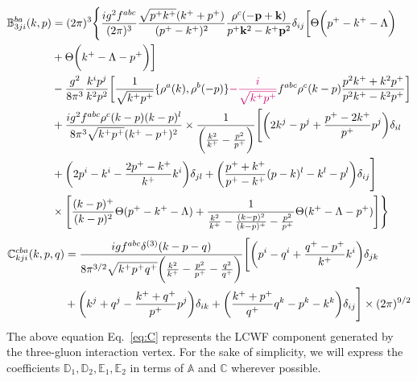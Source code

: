 \documentclass[a4paper,11pt]{article}
\def\v#1{\mathbf{#1}}
\def\mf#1{\mathbb{#1}}
\begin{document}
\begin{align} \label{eq:B3}
    \mf{B}^{ba}_{3ji}(k, p) & = (2\pi)^{3}\Bigg\{\frac{ig^2 f^{abc}}{(2\pi)^3} \frac{\sqrt{p^{+}k^{+}} (k^++p^+) } {(p^+-k^+)^2} \frac{\rho^c(-\v{p}+\v{k})}{p^{+}\v{k}^2 - k^{+}\v{p}^2} \delta_{ij}\bigg[\Theta\bigg(p^{+} - k^{+} - \Lambda\bigg)\notag \\ & +\Theta\bigg(k^{+}-\Lambda-p^{+}\bigg)\bigg]\notag \\ & -\frac{g^{2}}{8\pi^{3}}\frac{k^{i}p^{j}}{k^{2}p^{2}}\bigg[\frac{1}{\sqrt{k^{+}p^{+}}}\{\rho^{a}(k),\rho^{b}(-p)\}{\color{chg}-\frac{i}{\sqrt{k^{+}p^{+}}}}f^{abc}\rho^{c}(k-p)\frac{p^{2}k^{+}+k^{2}p^{+}}{p^{2}k^{+}-k^{2}p^{+}}\bigg]\notag \\ & + \frac{ig^{2}f^{abc}\rho^{c}(k-p)(k-p)^{l}}{8\pi^{3}\sqrt{k^{+}p^{+}}(k^{+}-p^{+})^{2}}\times \frac{1}{\bigg(\frac{k^{2}}{k^{+}}-\frac{p^{2}}{p^{+}}\bigg)} \Bigg[\bigg(2k^{j}-p^{j}+\frac{p^{+}-2k^{+}}{p^{+}}p^{j}\bigg)\delta_{il}\notag \\ & +\bigg(2p^{i}-k^{i}-\frac{2p^{+}-k^{+}}{k^{+}}k^{i}\bigg)\delta_{jl} +\bigg(\frac{p^{+}+k^{+}}{p^{+}-k^{+}}(p-k)^{l}-k^{l}-p^{l}\bigg)\delta_{ij}\Bigg]\notag \\ & \times \Bigg[\frac{(k-p)^{+}}{(k-p)^{2}}\Theta(p^{+}-k^{+}-\Lambda)+\frac{1}{\frac{k^{2}}{k^{+}}-\frac{(k-p)^{2}}{(k-p)^{+}}-\frac{p^{2}}{p^{+}}}\Theta(k^{+}-\Lambda-p^{+})\Bigg] \Bigg\}
\end{align}
\begin{align} \label{eq:C}
  \mf{C}^{cba}_{kji}(k,p,q) & = \frac{igf^{abc}\delta^{(3)}(k-p-q)}{8\pi^{3/2}\sqrt{k^{+}p^{+}q^{+}}\bigg(\frac{k^{2}}{k^{+}}-\frac{p^{2}}{p^{+}}-\frac{q^{2}}{q^{+}}\bigg)}\Bigg[\bigg(p^{i}-q^{i}+\frac{q^{+}-p^{+}}{k^{+}}k^{i}\bigg)\delta_{jk}\notag \\ & +\bigg(k^{j}+q^{j}-\frac{k^{+}+q^{+}}{p^{+}}p^{j}\bigg)\delta_{ik} +\bigg(\frac{k^{+}+p^{+}}{q^{+}}q^{k}-p^{k}-k^{k}\bigg)\delta_{ij}\Bigg]\times (2\pi)^{9/2}
\end{align}
The above equation Eq.~\eqref{eq:C} represents the LCWF component generated by the three-gluon interaction vertex. For the sake of simplicity, we will express the coefficients $\mf{D}_{1}, \mf{D}_{2}, \mf{E}_{1}, \mf{E}_{2}$ in terms of $\mf{A}$ and $\mf{C}$ wherever possible.
\end{document}
